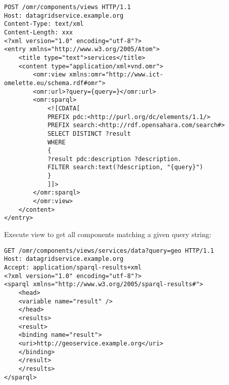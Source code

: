 \begin{lstlisting}[style=consola]
POST /omr/components/views HTTP/1.1
Host: datagridservice.example.org
Content-Type: text/xml
Content-Length: xxx
<?xml version="1.0" encoding="utf-8"?>
<entry xmlns="http://www.w3.org/2005/Atom">
	<title type="text">services</title>
	<content type="application/xml+vnd.omr">
		<omr:view xmlns:omr="http://www.ict-omelette.eu/schema.rdf#omr">
		<omr:url>?query={query=}</omr:url>
		<omr:sparql>
			<![CDATA[
			PREFIX pdc:<http://purl.org/dc/elements/1.1/>
			PREFIX search:<http://rdf.opensahara.com/search#>
			SELECT DISTINCT ?result
			WHERE
			{
			?result pdc:description ?description.
			FILTER search:text(?description, "{query}")
			}
			]]>
		</omr:sparql>
		</omr:view>
	</content>
</entry>

\end{lstlisting}

Execute view to get all components matching a given query string:

\begin{lstlisting}[style=consola]
GET /omr/components/views/services/data?query=geo HTTP/1.1
Host: datagridservice.example.org
Accept: application/sparql-results+xml
<?xml version="1.0" encoding="utf-8"?>
<sparql xmlns="http://www.w3.org/2005/sparql-results#">
	<head>
	<variable name="result" />
	</head>
	<results>
	<result>
	<binding name="result">
	<uri>http://geoservice.example.org</uri>
	</binding>
	</result>
	</results>
</sparql>

\end{lstlisting}